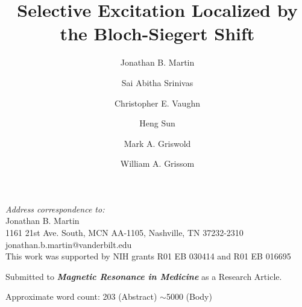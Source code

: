 \documentclass[a4paper,12pt]{article}
\begin{document}
\title{\vspace{-2cm}Selective Excitation Localized by the Bloch-Siegert Shift}
\date{}

\author[1,2]{Jonathan B. Martin}
\author[1,2]{Sai Abitha Srinivas}
\author[1,2]{Christopher E. Vaughn}
\author[2]{Heng Sun}
\author[3,4]{Mark A. Griswold}
\author[1,2,5]{William A. Grissom}


\maketitle

\vfill
\noindent

\noindent
\textit{Address correspondence to:} \\
  Jonathan B. Martin \\
  1161 21st Ave. South, MCN AA-1105, Nashville, TN 37232-2310 \\
  jonathan.b.martin@vanderbilt.edu\\


\noindent
This work was supported by NIH grants R01 EB 030414 and R01 EB 016695

\noindent
Submitted to \textbf{\textit{Magnetic Resonance in Medicine}} as a Research Article.

\noindent
Approximate word count: 203 (Abstract) $\sim$5000 (Body)\\

\clearpage
\end{document}
